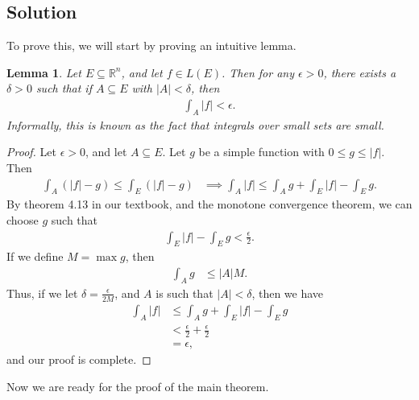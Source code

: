 \documentclass[10pt,a4paper]{article}
\theoremstyle{theorem}
\newtheorem{lemma}{Lemma}
\theoremstyle{definition}
\begin{document}
\subsection*{Solution}
To prove this, we will start by proving an intuitive lemma.
\begin{lemma}
Let $E \subseteq \mathbb{R}^n$, and let $f \in L(E)$. Then for any $\epsilon > 0$, there exists a $\delta > 0$ such that if $A \subseteq E$ with $|A| < \delta$, then 
\begin{align*}
\int_A |f| < \epsilon.
\end{align*}
Informally, this is known as the fact that integrals over small sets are small.
\end{lemma}
\begin{proof}
Let $\epsilon > 0$, and let $A \subseteq E$. Let $g$ be a simple function with $0 \leq g \leq |f|$. Then
\begin{align*}
\int_A (|f| - g) \leq \int_E (|f| - g) &\implies \int_A |f| \leq \int_A g + \int_E |f| - \int_E g.
\end{align*}
By theorem 4.13 in our textbook, and the monotone convergence theorem, we can choose $g$ such that 
\begin{align*}
\int_E |f| - \int_E g < \frac{\epsilon}{2}.
\end{align*}
If we define $M = \max g$, then 
\begin{align*}
\int_A g &\leq |A|M.
\end{align*}
Thus, if we let $\delta = \frac{\epsilon}{2M}$, and $A$ is such that $|A| < \delta$, then we have 
\begin{align*}
\int_A |f| &\leq \int_A g + \int_E |f| - \int_E g\\
&< \frac{\epsilon}{2} + \frac{\epsilon}{2}\\
&= \epsilon,
\end{align*}
and our proof is complete.
\end{proof}
Now we are ready for the proof of the main theorem.
\end{document}
